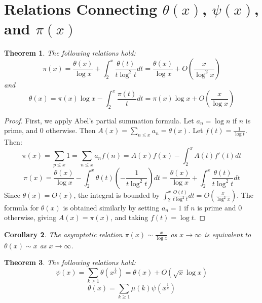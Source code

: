 \documentclass[a4paper]{article}
\newtheorem{theorem}{Theorem}
\newtheorem{corollary}[theorem]{Corollary}
\begin{document}
\section{\texorpdfstring{Relations Connecting $\theta(x)$, $\psi(x)$,
  and $\pi(x)$}{Relations Connecting Chebyshev functions and
Prime Counting function}}

\begin{theorem}
  The following relations hold:
  \[ \pi(x) = \frac{\theta(x)}{\log x} + \int_{2}^{x}
    \frac{\theta(t)}{t \log^2 t} dt = \frac{\theta(x)}{\log x} +
  O\left(\frac{x}{\log^2 x}\right) \]
  and
  \[ \theta(x) = \pi(x) \log x - \int_{2}^{x} \frac{\pi(t)}{t} dt =
  \pi(x) \log x + O\left(\frac{x}{\log x}\right) \]
\end{theorem}

\begin{proof}
  First, we apply Abel's partial summation formula. Let $a_n = \log
  n$ if $n$ is prime, and $0$ otherwise. Then $A(x) = \sum_{n \le x}
  a_n = \theta(x)$. Let $f(t) = \frac{1}{\log t}$. Then:
  \[ \pi(x) = \sum_{p \le x} 1 = \sum_{n \le x} a_n f(n) = A(x)f(x) -
  \int_{2}^{x} A(t)f'(t)dt \]
  \[ \pi(x) = \frac{\theta(x)}{\log x} - \int_{2}^{x} \theta(t)
    \left( -\frac{1}{t \log^2 t} \right) dt = \frac{\theta(x)}{\log x}
  + \int_{2}^{x} \frac{\theta(t)}{t \log^2 t} dt \]
  Since $\theta(x) = O(x)$, the integral is bounded by $\int_{2}^{x}
  \frac{O(t)}{t \log^2 t} dt = O\left(\frac{x}{\log^2 x}\right)$. The
  formula for $\theta(x)$ is obtained similarly by setting $a_n = 1$
  if $n$ is prime and $0$ otherwise, giving $A(x) = \pi(x)$, and
  taking $f(t) = \log t$.
\end{proof}

\begin{corollary}
  The asymptotic relation $\pi(x) \sim \frac{x}{\log x}$ as $x \to
  \infty$ is equivalent to $\theta(x) \sim x$ as $x \to \infty$.
\end{corollary}

\begin{theorem}
  The following relations hold:
  \[ \psi(x) = \sum_{k \ge 1} \theta(x^{\frac{1}{k}}) = \theta(x) +
  O(\sqrt{x} \log x) \]
  \[ \theta(x) = \sum_{k \ge 1} \mu(k) \psi(x^{\frac{1}{k}}) \]
\end{theorem}
\end{document}
